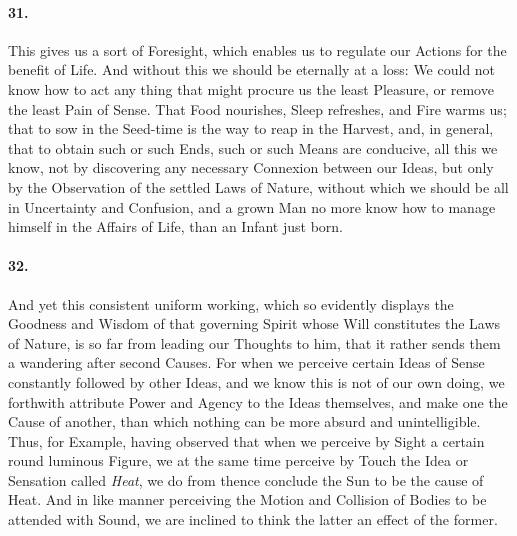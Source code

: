 \documentclass[]{article}
\newenvironment{sectionbody}{}{}
\begin{document}
\begin{sectionbody}
\paragraph{31.} This gives us a sort of Foresight, which enables us to regulate
our Actions for the benefit of Life.  And without this we should
be eternally at a loss: We could not know how to act any thing
that might procure us the least Pleasure, or remove the least
Pain of Sense.  That Food nourishes, Sleep refreshes, and Fire
warms us; that to sow in the Seed-time is the way to reap in the
Harvest, and, in general, that to obtain such or such Ends, such
or such Means are conducive, all this we know, not by discovering
any necessary Connexion between our Ideas, but only by the
Observation of the settled Laws of Nature, without which we
should be all in Uncertainty and Confusion, and a grown Man no
more know how to manage himself in the Affairs of Life, than an
Infant just born.



\paragraph{32.} And yet this consistent uniform working, which so evidently
displays the Goodness and Wisdom of that governing Spirit whose
Will constitutes the Laws of Nature, is so far from leading our
Thoughts to him, that it rather sends them a wandering after
second Causes.  For when we perceive certain Ideas of Sense
constantly followed by other Ideas, and we know this is not of
our own doing, we forthwith attribute Power and Agency to the
Ideas themselves, and make one the Cause of another, than which
nothing can be more absurd and unintelligible.  Thus, for
Example, having observed that when we perceive by Sight a certain
round luminous Figure, we at the same time perceive by Touch the
Idea or Sensation called \emph{Heat}, we do from thence
conclude the Sun to be the cause of Heat.  And in like manner
perceiving the Motion and Collision of Bodies to be attended with
Sound, we are inclined to think the latter an effect of the
former.




\end{sectionbody}
\end{document}
